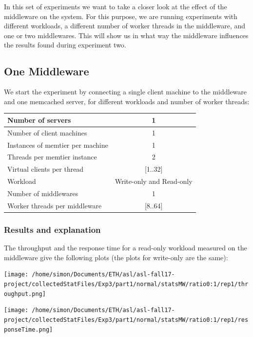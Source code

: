 \documentclass[11pt,a4paper]{article}
\begin{document}
In this set of experiments we want to take a closer look at the effect of the middleware on the system. For this purpose, we are running experiments with different workloads, a different number of worker threads in the middleware, and one or two middlewares. This will show us in what way the middleware influences the results found during experiment two. 


\subsection{One Middleware}

We start the experiment by connecting a single client machine to the middleware and one memcached server, for different workloads and number of worker threads: 

\begin{center}
	\scriptsize{
		\begin{tabular}{|l|c|}
			\hline Number of servers                & 1                        \\ 
			\hline Number of client machines        & 1                        \\ 
			\hline Instances of memtier per machine & 1                        \\ 
			\hline Threads per memtier instance     & 2                        \\
			\hline Virtual clients per thread       & [1..32]                  \\ 
			\hline Workload                         & Write-only and Read-only \\
			\hline Number of middlewares            & 1                        \\
			\hline Worker threads per middleware    & [8..64]                  \\
			\hline 
		\end{tabular}
	} 
\end{center}

\subsubsection{Results and explanation}

The throughput and the response time for a read-only workload measured on the middleware give the following plots (the plots for write-only are the same):

\begin{center}
\texttt{[image: /home/simon/Documents/ETH/asl/asl-fall17-project/collectedStatFiles/Exp3/part1/normal/statsMW/ratio0:1/rep1/throughput.png]}
\end{center}
\begin{center}
\texttt{[image: /home/simon/Documents/ETH/asl/asl-fall17-project/collectedStatFiles/Exp3/part1/normal/statsMW/ratio0:1/rep1/responseTime.png]}
\end{center}
\end{document}
